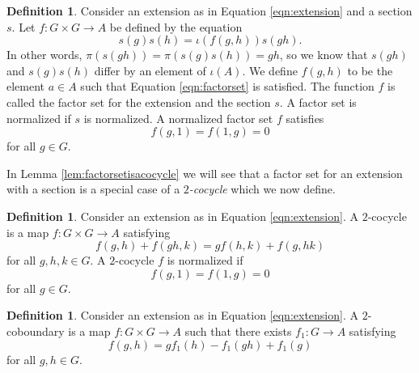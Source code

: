 \documentclass{dcthesis}
\newcommand{\defi}[1]{\textsf{#1}}
\numberwithin{equation}{section}
\theoremstyle{definition}
\newtheorem{definition}[equation]{Definition}
\theoremstyle{remark}
\begin{document}
{{    %
    \begin{definition}
      \label{def:factorset}
      Consider an extension as in Equation \ref{eqn:extension}
      and a section $s$.
      Let $f\colon G\times G\to A$ be defined by the equation
      \begin{equation}
        \label{eqn:factorset}
        s(g)s(h) = \iota(f(g,h))s(gh).
      \end{equation}
      In other words,
      $\pi(s(gh)) = \pi(s(g)s(h)) = gh$,
      so we know that
      $s(gh)$ and $s(g)s(h)$ differ by an element of $\iota(A)$.
      We define $f(g,h)$ to be the element $a\in A$
      such that
      Equation \ref{eqn:factorset}
      is satisfied.
      The function $f$ is called the \defi{factor set}
      for the extension and the section $s$.
      A factor set is \defi{normalized}
      if $s$ is normalized.
      A normalized factor set $f$ satisfies
      \[
        f(g,1)=f(1,g)=0
      \]
      for all $g\in G$.
    \end{definition}
    In Lemma \ref{lem:factorsetisacocycle}
    we will see that a factor set for an extension with a section
    is a special case of a
    \emph{$2$-cocycle}
    which we now define.
    \begin{definition}
      \label{def:twococycle}
      Consider an extension as in Equation \ref{eqn:extension}.
      A \defi{$2$-cocycle}
      is a map
      $f\colon G\times G\to A$
      satisfying
      \begin{equation}
        \label{eqn:twococycle}
        f(g,h)+f(gh,k)=gf(h,k)+f(g,hk)
      \end{equation}
      for all $g,h,k\in G$.
      A $2$-cocycle $f$ is \defi{normalized}
      if
      \[
        f(g,1)=f(1,g)=0
      \]
      for all $g\in G$.
    \end{definition}
    \begin{definition}
      \label{def:twocoboundary}
      Consider an extension as in Equation \ref{eqn:extension}.
      A \defi{$2$-coboundary}
      is a map
      $f\colon G\times G\to A$
      such that there exists
      $f_1\colon G\to A$ satisfying
      \begin{equation}
        \label{eqn:twocoboundary}
        f(g,h) = gf_1(h)-f_1(gh)+f_1(g)
      \end{equation}
      for all $g,h\in G$.

\end{definition}}}
\end{document}
